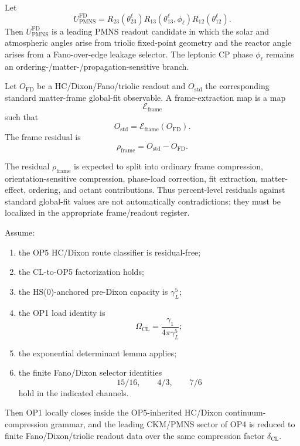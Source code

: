 \begin{theorem}
Let
\[
  U_{\mathrm{PMNS}}^{\mathrm{FD}}
  =
  R_{23}(\theta_{23}^{\ell})
  R_{13}(\theta_{13}^{\ell},\phi_\ell)
  R_{12}(\theta_{12}^{\ell}).
\]
Then \(U_{\mathrm{PMNS}}^{\mathrm{FD}}\) is a leading PMNS readout candidate in which the solar and atmospheric angles arise from triolic fixed-point geometry and the reactor angle arises from a Fano-over-edge leakage selector.  The leptonic CP phase \(\phi_\ell\) remains an ordering-/matter-/propagation-sensitive branch.
\end{theorem}

\begin{definition}
Let \(O_{\mathrm{FD}}\) be a HC/Dixon/Fano/triolic readout and \(O_{\mathrm{std}}\) the corresponding standard matter-frame global-fit observable.  A frame-extraction map is a map
\[
  \mathcal E_{\mathrm{frame}}
\]
such that
\[
  O_{\mathrm{std}}
  =
  \mathcal E_{\mathrm{frame}}(O_{\mathrm{FD}}).
\]
The frame residual is
\[
  \rho_{\mathrm{frame}}
  =
  O_{\mathrm{std}}-O_{\mathrm{FD}}.
\]
\end{definition}

\begin{remark}
The residual \(\rho_{\mathrm{frame}}\) is expected to split into ordinary frame compression, orientation-sensitive compression, phase-load correction, fit extraction, matter-effect, ordering, and octant contributions.  Thus percent-level residuals against standard global-fit values are not automatically contradictions; they must be localized in the appropriate frame/readout register.
\end{remark}

\begin{theorem}
Assume:
\begin{enumerate}
  \item the OP5 HC/Dixon route classifier is residual-free;
  \item the CL-to-OP5 factorization holds;
  \item the HS(0)-anchored pre-Dixon capacity is \(\gamma_L^5\);
  \item the OP1 load identity is
  \[
    \Omega_{\mathrm{CL}}
    =
    \frac{\gamma_1}{4\pi\gamma_L^5};
  \]
  \item the exponential determinant lemma applies;
  \item the finite Fano/Dixon selector identities
  \[
    15/16,
    \qquad
    4/3,
    \qquad
    7/6
  \]
  hold in the indicated channels.
\end{enumerate}
Then OP1 locally closes inside the OP5-inherited HC/Dixon continuum-compression grammar, and the leading CKM/PMNS sector of OP4 is reduced to finite Fano/Dixon/triolic readout data over the same compression factor \(\delta_{\mathrm{CL}}\).
\end{theorem}

